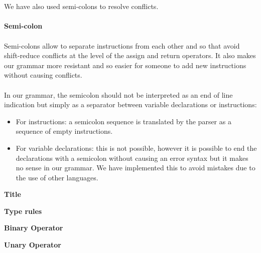 \documentclass[11pt]{report}
\begin{document}
\\ \\
\newpage
We have also used semi-colons to resolve conflicts. \\ \\
\tabto{2cm} \textbf{Semi-colon} \\ \\
\tabto{1cm}Semi-colons allow to separate instructions from each other and so that avoid shift-reduce conflicts at the level of the assign and return operators. It also makes our grammar more resistant and so easier for someone to add new instructions without causing conflicts. \\ \\
\tabto{1cm} In our grammar, the semicolon should not be interpreted as an end of line indication but simply as a separator between variable declarations or instructions:
\begin{itemize}
\item For instructions: a semicolon sequence is translated by the parser as a sequence of empty instructions.
\item For variable declarations: this is not possible, however it is possible to end the declarations with a semicolon without causing an error syntax but it makes no sense in our grammar. We have implemented this to avoid mistakes due to the use of other languages.
\end{itemize}

\tabto{0cm} {\Large \textbf{Title}}



\newpage
\centerline{\textbf{\Huge Type rules}}
\vspace*{3pt}
\vspace*{20pt}


\tabto{0cm} {\large \textbf{Binary Operator}}
\begin{prooftree}
\end{prooftree}

\tabto{0cm} {\large \textbf{Unary Operator}}
\begin{prooftree}
\end{prooftree}
\end{document}
